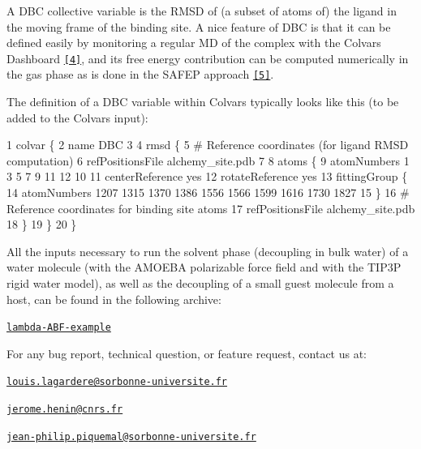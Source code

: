 A D\-B\-C collective variable is the R\-M\-S\-D of (a subset of atoms of) the ligand in the moving frame of the binding site. A nice feature of D\-B\-C is that it can be defined easily by monitoring a regular M\-D of the complex with the Colvars Dashboard \href{#ref4}{\tt \mbox{[}4\mbox{]}}, and its free energy contribution can be computed numerically in the gas phase as is done in the S\-A\-F\-E\-P approach \href{#ref5}{\tt \mbox{[}5\mbox{]}}.

The definition of a D\-B\-C variable within Colvars typically looks like this (to be added to the Colvars input)\-:


\begin{DoxyCode}
1 colvar \{
2     name DBC
3 
4     rmsd \{
5         # Reference coordinates (for ligand RMSD computation)
6         refPositionsFile alchemy\_site.pdb
7 
8         atoms \{
9             atomNumbers 1 3 5 7 9 11 12
10 
11             centerReference  yes
12             rotateReference  yes
13             fittingGroup \{
14                 atomNumbers 1207 1315 1370 1386 1556 1566 1599 1616 1730 1827
15             \}
16             # Reference coordinates for binding site atoms
17             refPositionsFile alchemy\_site.pdb
18         \}
19     \}
20 \}
\end{DoxyCode}
 



All the inputs necessary to run the solvent phase (decoupling in bulk water) of a water molecule (with the A\-M\-O\-E\-B\-A polarizable force field and with the T\-I\-P3\-P rigid water model), as well as the decoupling of a small guest molecule from a host, can be found in the following archive\-:

\href{https://github.com/TinkerTools/tinker-hp/tree/master/v1.2/tutorials/lambda-ABF-example.tar.gz}{\tt lambda-\/\-A\-B\-F-\/example} 



For any bug report, technical question, or feature request, contact us at\-:
\begin{DoxyItemize}
\item \href{mailto:louis.lagardere@sorbonne-universite.fr}{\tt louis.\-lagardere@sorbonne-\/universite.\-fr}
\item \href{mailto:jerome.henin@cnrs.fr}{\tt jerome.\-henin@cnrs.\-fr}
\item \href{mailto:jean-philip.piquemal@sorbonne-universite.fr}{\tt jean-\/philip.\-piquemal@sorbonne-\/universite.\-fr} 


\end{DoxyItemize}


